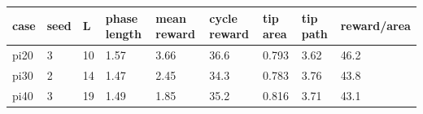 \begin{tabular}{lllllllll}
\toprule
case & seed & L & phase length & mean reward & cycle reward & tip area & tip path & reward/area \\
\midrule
pi20 & 3 & 10 & 1.57 & 3.66 & 36.6 & 0.793 & 3.62 & 46.2 \\
pi30 & 2 & 14 & 1.47 & 2.45 & 34.3 & 0.783 & 3.76 & 43.8 \\
pi40 & 3 & 19 & 1.49 & 1.85 & 35.2 & 0.816 & 3.71 & 43.1 \\
\bottomrule
\end{tabular}
